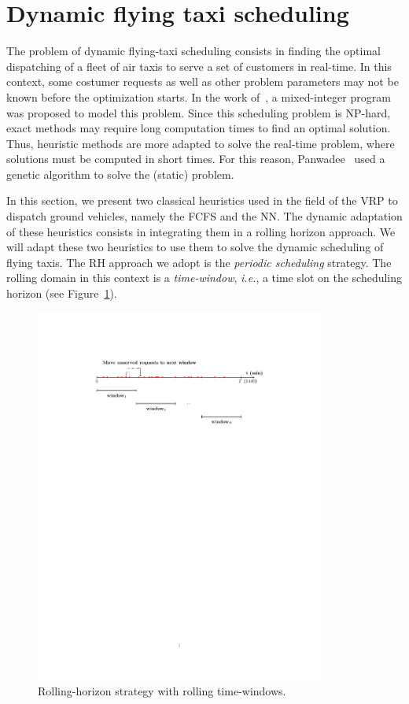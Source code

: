 
\section{Dynamic flying taxi scheduling}

The problem of dynamic flying-taxi scheduling consists in finding the optimal dispatching of a fleet of air taxis to serve a set of customers in real-time. In this context, some costumer requests as well as other problem parameters may not be known before the optimization starts. In the work of~\cite{panwadee2021}, a mixed-integer program was proposed to model this problem. Since this scheduling problem is NP-hard, exact methods may require long computation times to find an optimal solution. Thus, heuristic methods are more adapted to solve the real-time problem, where solutions must be computed in short times. For this reason, Panwadee~\cite{panwadee2021} used a genetic algorithm to solve the (static) problem.

In this section, we present two classical heuristics used in the field of the VRP to dispatch ground vehicles, namely the \acs{FCFS} and the \acs{NN}. The dynamic adaptation of these heuristics consists in integrating them in a rolling horizon approach. We will adapt these two heuristics to use them to solve the dynamic scheduling of flying taxis. The \acs{RH} approach we adopt is the \textit{periodic scheduling} strategy. The rolling domain in this context is a \textit{time-window}, \textit{i.e.}, a time slot on the scheduling horizon (see Figure~\ref{fig:rh}).

\begin{figure}[h!]
	\centering
	\includegraphics[trim=120 550 120 100,clip,width=0.85\textwidth]{images/rh-illustration.pdf}
	\caption{Rolling-horizon strategy with rolling time-windows.}
	\label{fig:rh}
\end{figure}


